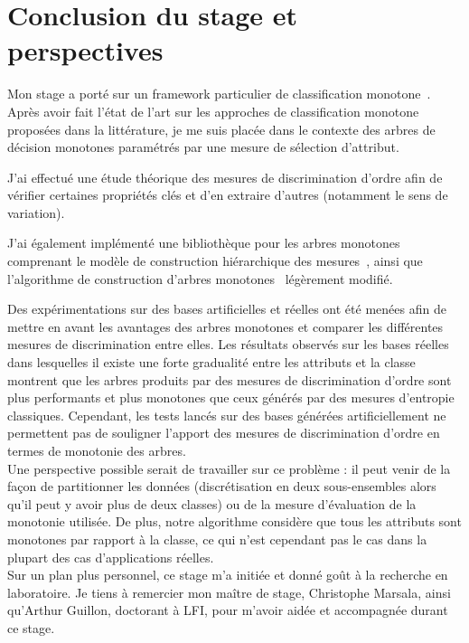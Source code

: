 \documentclass[a4paper]{article}
\begin{document}
\section{Conclusion du stage et perspectives} 

Mon stage a porté sur un framework particulier de classification
monotone~\cite{marsala-rank}. Après avoir fait l'état de l'art sur les approches
de classification monotone proposées dans la littérature, je me suis placée dans
le contexte des arbres de décision monotones paramétrés par une mesure de
sélection d'attribut.

J'ai effectué une étude théorique des mesures de discrimination d'ordre afin de
vérifier certaines propriétés clés et d'en extraire d'autres (notamment le sens
de variation). 

J'ai également implémenté
une bibliothèque pour les arbres monotones comprenant le modèle de construction
hiérarchique des mesures~\cite{marsala-rank}, ainsi que l'algorithme de
construction d'arbres monotones~\cite{marsala-rank} légèrement modifié. 

Des expérimentations sur des bases artificielles et réelles ont été menées afin de
mettre en avant les avantages des arbres monotones et comparer les différentes
mesures de discrimination entre elles. Les résultats observés sur les bases
réelles dans lesquelles il existe une forte gradualité entre les attributs et la
classe montrent que les arbres produits par des mesures de discrimination
d'ordre sont plus performants et plus monotones que ceux générés par des mesures
d'entropie classiques. Cependant, les tests lancés sur des bases générées
artificiellement ne permettent pas de souligner l'apport des mesures de
discrimination d'ordre en termes de monotonie des
arbres. \\

Une perspective possible serait de travailler sur ce problème : il peut venir de la façon de partitionner les données (discrétisation en deux sous-ensembles
alors qu'il peut y avoir plus de deux classes) ou de la mesure d'évaluation de la
monotonie utilisée. De plus, notre algorithme considère que tous les attributs
sont monotones par rapport à la classe, ce qui n'est cependant pas le cas dans
la plupart des cas d'applications réelles. \\

Sur un plan plus personnel, ce stage m'a initiée et donné goût à la recherche en
laboratoire. Je tiens à remercier mon maître de stage, Christophe Marsala, ainsi
qu'Arthur Guillon, doctorant à LFI, pour m'avoir aidée et accompagnée durant ce
stage.
\end{document}
